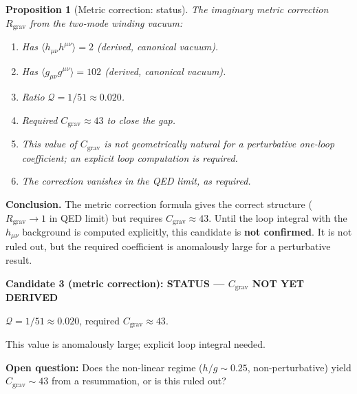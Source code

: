 \documentclass[11pt,a4paper]{article}
\newtheorem{proposition}{Proposition}
\theoremstyle{remark}
\begin{document}
\begin{proposition}[Metric correction: status]
\label{prop:metric_status}
The imaginary metric correction $R_{\mathrm{grav}}$ from the two-mode winding vacuum:
\begin{enumerate}
  \item Has $\langle h_{\mu\nu}h^{\mu\nu}\rangle = 2$ (derived, canonical vacuum).
  \item Has $\langle g_{\mu\nu}g^{\mu\nu}\rangle = 102$ (derived, canonical vacuum).
  \item Ratio $\mathcal{Q} = 1/51 \approx 0.020$.
  \item Required $C_{\mathrm{grav}} \approx 43$ to close the gap.
  \item This value of $C_{\mathrm{grav}}$ is \emph{not geometrically natural} for a
    perturbative one-loop coefficient; an explicit loop computation is required.
  \item The correction vanishes in the QED limit, as required.
\end{enumerate}
\end{proposition}

\textbf{Conclusion.} The metric correction formula gives the correct structure ($R_{\mathrm{grav}} \to 1$
in QED limit) but requires $C_{\mathrm{grav}} \approx 43$. Until the loop integral with the
$h_{\mu\nu}$ background is computed explicitly, this candidate is \textbf{not confirmed}.
It is not ruled out, but the required coefficient is anomalously large for a perturbative result.

\begin{center}
\textbf{Candidate 3 (metric correction): STATUS — $C_{\mathrm{grav}}$ NOT YET DERIVED}

$\mathcal{Q} = 1/51 \approx 0.020$, required $C_{\mathrm{grav}} \approx 43$.

This value is anomalously large; explicit loop integral needed.

\medskip
\textbf{Open question:} Does the non-linear regime ($h/g \sim 0.25$, non-perturbative)
yield $C_{\mathrm{grav}} \sim 43$ from a resummation, or is this ruled out?
\end{center}

\ifdefined\INCLUDEMODE\else
\end{document}
